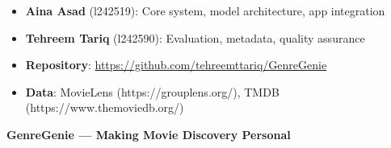 \documentclass[11pt,a4paper]{article}
\begin{document}
\begin{itemize}
    \item \textbf{Aina Asad} (l242519): Core system, model architecture, app integration
    \item \textbf{Tehreem Tariq} (l242590): Evaluation, metadata, quality assurance
    \item \textbf{Repository}: \url{https://github.com/tehreemttariq/GenreGenie}
    \item \textbf{Data}: MovieLens (https://grouplens.org/), TMDB (https://www.themoviedb.org/)
\end{itemize}

\begin{center}
    \textbf{\large GenreGenie — Making Movie Discovery Personal}
\end{center}
\end{document}

